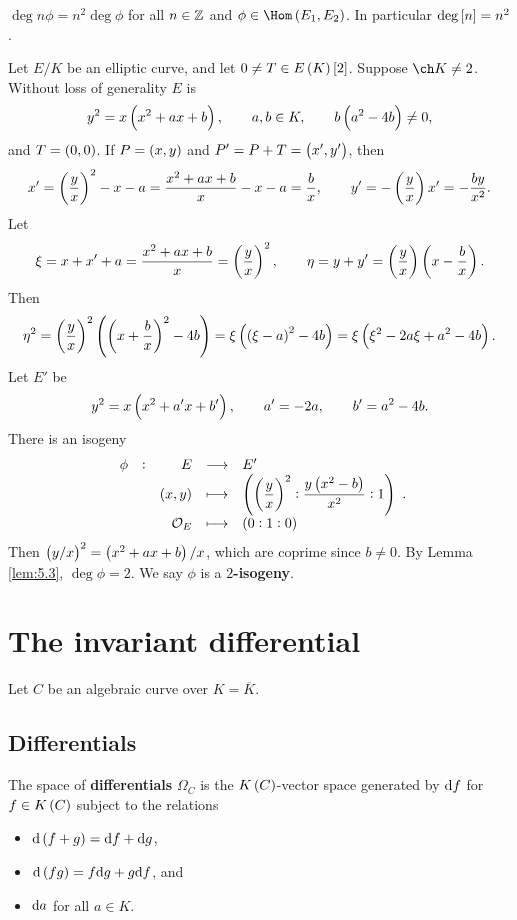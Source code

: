 \begin{corollary}
\label{cor:5.8}
$ \deg n\phi = n^2\deg \phi $ for all $ n \in \mathbb{Z} $ and $ \phi \in \Hom\br{E_1, E_2} $. In particular $ \deg \sbr{n} = n^2 $.
\end{corollary}

\pagebreak

\begin{example}
Let $ E / K $ be an elliptic curve, and let $ 0 \ne T \in E\br{K}\sbr{2} $. Suppose $ \ch K \ne 2 $. Without loss of generality $ E $ is
$$ y^2 = x\br{x^2 + ax + b}, \qquad a, b \in K, \qquad b\br{a^2 - 4b} \ne 0, $$
and $ T = \br{0, 0} $. If $ P = \br{x, y} $ and $ P' = P + T = \br{x', y'} $, then
$$ x' = \br{\dfrac{y}{x}}^2 - x - a = \dfrac{x^2 + ax + b}{x} - x - a = \dfrac{b}{x}, \qquad y' = -\br{\dfrac{y}{x}}x' = -\dfrac{by}{x^2}. $$
Let
$$ \xi = x + x' + a = \dfrac{x^2 + ax + b}{x} = \br{\dfrac{y}{x}}^2, \qquad \eta = y + y' = \br{\dfrac{y}{x}}\br{x - \dfrac{b}{x}}. $$
Then
$$ \eta^2 = \br{\dfrac{y}{x}}^2\br{\br{x + \dfrac{b}{x}}^2 - 4b} = \xi\br{\br{\xi - a}^2 - 4b} = \xi\br{\xi^2 - 2a\xi + a^2 - 4b}. $$
Let $ E' $ be
$$ y^2 = x\br{x^2 + a'x + b'}, \qquad a' = -2a, \qquad b' = a^2 - 4b. $$
There is an isogeny
$$ \functions[\phi]{E}{E'}{\br{x, y}}{\br{\br{\dfrac{y}{x}}^2 : \dfrac{y\br{x^2 - b}}{x^2} : 1}}{\OOO_E}{\br{0 : 1 : 0}}. $$
Then $ \br{y / x}^2 = \br{x^2 + ax + b} / x $, which are coprime since $ b \ne 0 $. By Lemma \ref{lem:5.3}, $ \deg \phi = 2 $. We say $ \phi $ is a \textbf{$ 2 $-isogeny}.
\end{example}

\pagebreak

\section{The invariant differential}


Let $ C $ be an algebraic curve over $ K = \overline{K} $.

\subsection{Differentials}

\begin{definition*}
The space of \textbf{differentials} $ \Omega_C $ is the $ K\br{C} $-vector space generated by $ \mathrm{d} f $ for $ f \in K\br{C} $ subject to the relations
\begin{itemize}
\item $ \d\br{f + g} = \d f + \d g $,
\item $ \d\br{fg} = f\d g + g\d f $, and
\item $ \mathrm{d} a $ for all $ a \in K $.
\end{itemize}
\end{definition*}

